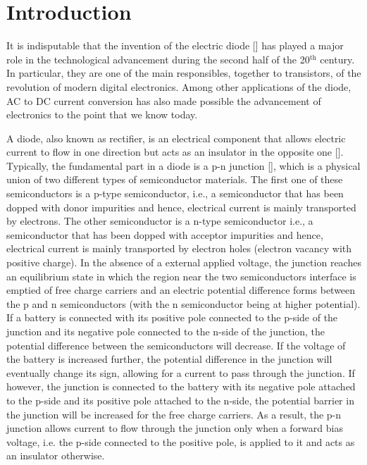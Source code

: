 
\chapter*{Introduction} %
\label{Introduction}

It is indisputable that the invention of the electric diode [] has played a major role in the technological advancement during the second half of the 20$^\text{th}$ century. In particular, they are one of the main responsibles, together to transistors, of the revolution of modern digital electronics. Among other applications of the diode, AC to DC current conversion has also made possible the advancement of electronics to the point that we know today.

A diode, also known as rectifier, is an electrical component that allows electric current to flow in one direction but acts as an insulator in the opposite one []. Typically, the fundamental part in a diode is a p-n junction [], which is a physical union of two different types of semiconductor materials. The first one of these semiconductors is a p-type semiconductor, i.e., a semiconductor that has been dopped with donor impurities and hence, electrical current is mainly transported by electrons. The other semiconductor is a n-type semiconductor i.e., a semiconductor that has been dopped with acceptor impurities and hence, electrical current is mainly transported by electron holes (electron vacancy with positive charge). In the absence of a external applied voltage, the junction reaches an equilibrium state in which the region near the two semiconductors interface is emptied of free charge carriers and an electric potential difference forms between the p and n semiconductors (with the n semiconductor being at higher potential). If a battery is connected with its positive pole connected to the p-side of the junction and its negative pole connected to the n-side of the junction, the potential difference between the semiconductors will decrease. If the voltage of the battery is increased further, the potential difference in the junction will eventually change its sign, allowing for a current to pass through the junction. If however, the junction is connected to the battery with its negative pole attached to the p-side and its positive pole attached to the n-side, the potential barrier in the junction will be increased for the free charge carriers. As a result, the p-n junction allows current to flow through the junction only when a forward bias voltage, i.e. the p-side connected to the positive pole, is applied to it and acts as an insulator otherwise.

